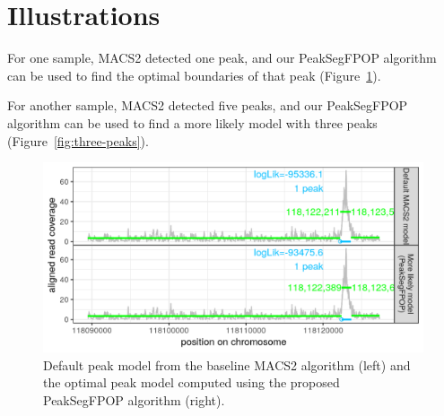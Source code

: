 \documentclass[article]{jss}
\newcommand{\fct}[1]{\code{#1()}}
\begin{document}
\section{Illustrations} \label{sec:illustrations}

For one sample, MACS2 detected one peak, and our PeakSegFPOP algorithm
can be used to find the optimal boundaries of that peak
(Figure~\ref{fig:one-peak}).

For another sample, MACS2 detected five peaks, and our PeakSegFPOP
algorithm can be used to find a more likely model with three peaks
(Figure~\ref{fig:three-peaks}).


\begin{figure}[t!]
\centering
\includegraphics{jss-figure-more-likely-models-one-peak}
\caption{\label{fig:one-peak} Default peak model from the baseline
  MACS2 algorithm (left) and the optimal peak model computed using the
  proposed PeakSegFPOP algorithm (right).}
\end{figure}
\end{document}
